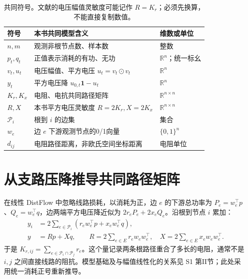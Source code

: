 \documentclass[UTF8,11pt,fontset=fandol,openany,oneside]{ctexbook}
\newcommand{\R}{\mathbb{R}}
\theoremstyle{definition}
\theoremstyle{remark}
\numberwithin{equation}{chapter}
\begin{document}
\begin{table}[htbp]\centering\small
\begin{tabularx}{\textwidth}{lXl}
\toprule 符号 & 本书共同模型含义 & 维数或单位\\\midrule
$n,m$ & 观测非根节点数、样本数 & 整数\\
$p_t,q_t$ & 正值表示消耗的有功、无功 & $\R^n$；统一标幺\\
$v_t,u_t$ & 电压幅值、平方电压 $u_t=v_t\odot v_t$ & $\R^n$\\
$y_t$ & 平方电压降 $u_{0,t}\mathbf1-u_t$ & $\R^n$\\
$K_r,K_x$ & 电阻、电抗共同路径矩阵 & $\R^{n\times n}$\\
$R,X$ & 本书平方电压灵敏度 $R=2K_r,X=2K_x$ & $\R^{n\times n}$\\
$\mathcal P_i$ & 根到 $i$ 的边集 & 集合\\
$w_e$ & 边 $e$ 下游观测节点的0/1向量 & $\{0,1\}^n$\\
$d_{ij}$ & 电阻路径距离，非欧氏空间坐标距离 & 电阻单位\\
\bottomrule
\end{tabularx}
\caption{共同符号。文献的电压幅值灵敏度可能记作 $R=K_r$；必须先换算，不能直接复制数值。}
\end{table}

\section{从支路压降推导共同路径矩阵}
在线性 DistFlow 中忽略线路损耗，以消耗为正，边 $e$ 的下游总功率为 $P_e=w_e^\top p$、$Q_e=w_e^\top q$，边两端平方电压降近似为 $2r_eP_e+2x_eQ_e$。沿根到节点 $i$ 累加：
\begin{align}
 y_i&=2\sum_{e\in\mathcal P_i}(r_ew_e^\top p+x_ew_e^\top q),\\
 y&=Rp+Xq,\qquad
 R=2\sum_{e\in E}r_ew_ew_e^\top,\quad
 X=2\sum_{e\in E}x_ew_ew_e^\top.\label{eq:tb-base-rx}
\end{align}
于是 $K_{r,ij}=\sum_{e\in\mathcal P_i\cap\mathcal P_j}r_e$。这个量记录两条根路径重合了多长的电阻，通常不是 $i,j$ 之间直接线路的阻抗。模型基础及与幅值线性化的关系见 S1 第II节\citep{S1}；此处采用统一消耗正号重新推导。
\end{document}

